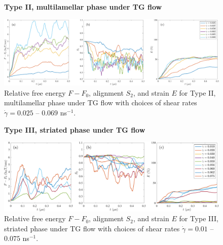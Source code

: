 \begin{figure}[h!]
\begin{center}
\textbf{Type II, multilamellar phase under TG flow}\par\medskip
\includegraphics[width=\textwidth]{SMFigures/MLTGRaw.pdf}
\end{center}
\caption{
Relative free energy $F - F_0$,
alignment $S_2$, and strain $E$ for
Type II, multilamellar phase under TG flow with choices of shear rates $\dot\gamma=0.025$ -- $0.069$ ns$^{-1}$.
}
\label{fig:mltgraw}
\end{figure}


\begin{figure}[h!]
\begin{center}
\textbf{Type III, striated phase under TG flow}\par\medskip
\includegraphics[width=\textwidth]{SMFigures/StTGRaw.pdf}
\end{center}
\caption{
Relative free energy $F - F_0$,
alignment $S_2$, and strain $E$ for
Type III, striated phase under TG flow with choices of shear rates $\dot\gamma=0.01$ -- $0.075$ ns$^{-1}$.
}
\label{fig:sttgraw}
\end{figure}




